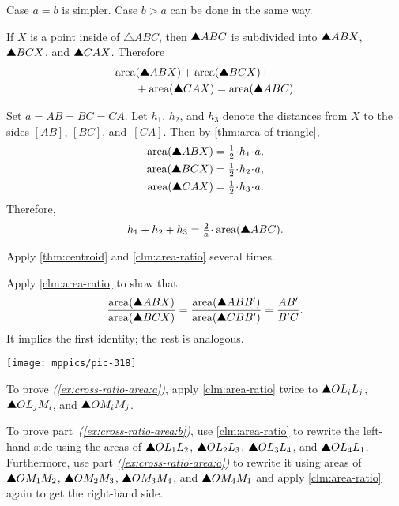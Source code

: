 Case $a=b$ is simpler.
Case $b>a$ can be done in the same way.


If $X$ is a point inside of $\triangle ABC$, then $\solidtriangle ABC$ is subdivided into $\solidtriangle ABX$, $\solidtriangle BCX$, and $\solidtriangle CAX$.
Therefore
\begin{align*}
&\area(\solidtriangle ABX)
+\area(\solidtriangle BCX)+
\\
&\qquad+\area(\solidtriangle CAX)
=\area(\solidtriangle ABC).
\end{align*}

Set $a=AB=BC=CA$.
Let $h_1$, $h_2$, and $h_3$ denote the distances from $X$ to the sides $[AB]$, $[BC]$, and~$[CA]$. 
Then by \ref{thm:area-of-triangle},
\begin{align*}
\area(\solidtriangle ABX)&=\tfrac12\cdot h_1\cdot a,
\\
\area(\solidtriangle BCX)&=\tfrac12\cdot h_2\cdot a,
\\
\area(\solidtriangle CAX)&=\tfrac12\cdot h_3\cdot a.
\end{align*}
Therefore, 
\[h_1+h_2+h_3=\tfrac2a\cdot\area(\solidtriangle ABC).\]

Apply \ref{thm:centroid} and \ref{clm:area-ratio} several times.

Apply \ref{clm:area-ratio} to show that
\[\frac{\area(\solidtriangle ABX)}{\area(\solidtriangle BCX)}=\frac{\area(\solidtriangle ABB')}{\area(\solidtriangle CBB')}=\frac{AB'}{B'C}.\]
It implies the first identity; the rest is analogous.

\begin{Figure}
\vskip0mm
\centering
\texttt{[image: mppics/pic-318]}
\end{Figure}

To prove \textit{(\ref{ex:cross-ratio-area:a})}, apply \ref{clm:area-ratio} twice to $\solidtriangle OL_iL_j$, $\solidtriangle OL_jM_i$, and $\solidtriangle OM_iM_j$.

To prove part~\textit{(\ref{ex:cross-ratio-area:b})}, use \ref{clm:area-ratio} to rewrite the left-hand side using the areas of $\solidtriangle OL_1L_2$, $\solidtriangle OL_2L_3$, $\solidtriangle OL_3L_4$, and $\solidtriangle OL_4L_1$.
Furthermore, use part \textit{(\ref{ex:cross-ratio-area:a})} to rewrite it using areas of $\solidtriangle OM_1M_2$, $\solidtriangle OM_2M_3$, $\solidtriangle OM_3M_4$, and $\solidtriangle OM_4M_1$ and apply \ref{clm:area-ratio} again to get the right-hand side.


